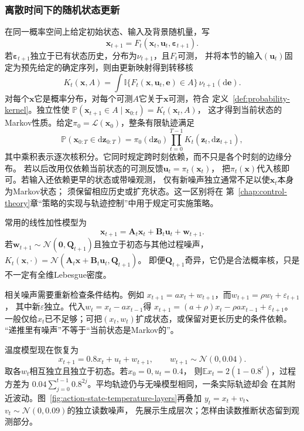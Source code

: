 \subsubsection{离散时间下的随机状态更新}
在同一概率空间上给定初始状态、输入及背景随机量，写
\[
  \bm x_{t+1}=F_t(\bm x_t,\bm u_t,\bm\varepsilon_{t+1}).
\]
若$\bm\varepsilon_{t+1}$独立于已有状态历史，分布为$\nu_{t+1}$，且$F_t$可测，
并将本节的输入$(\bm u_t)$固定为预先给定的确定序列，则由更新映射得到转移核
\[
  K_t(\bm x,A)=\int
    \mathbb I\{F_t(\bm x,\bm u_t,\bm e)\in A\}\,\nu_{t+1}(\mathrm d\bm e).
\]
对每个$\bm x$它是概率分布，对每个可测$A$它关于$\bm x$可测，符合
定义~\ref{def:probability-kernel}。独立性使
$\mathbb P(\bm x_{t+1}\in A\mid\bm x_{0:t})=K_t(\bm x_t,A)$，
这才得到当前状态的Markov性质。给定$\pi_0=\mathcal L(\bm x_0)$，整条有限轨迹满足
\[
  \mathbb P(\bm x_{0:T}\in\mathrm d\bm z_{0:T})
  =\pi_0(\mathrm d\bm z_0)
    \prod_{t=0}^{T-1}K_t(\bm z_t,\mathrm d\bm z_{t+1}),
\]
其中乘积表示逐次核积分。它同时规定跨时刻依赖，而不只是各个时刻的边缘分布。
若以后改用仅依赖当前状态的可测反馈$\bm u_t=\pi_t(\bm x_t)$，
把$\pi_t(\bm x)$代入核即可。若输入还依赖更早的状态或带噪观测，
仅有新噪声独立通常不足以使$\bm x_t$本身为Markov状态；
须保留相应历史或扩充状态。这一区别将在
第~\ref{chap:control-theory}章“策略的实现与轨迹控制”中用于规定可实施策略。

常用的线性加性模型为
\begin{equation}
  \bm x_{t+1}=\bm A_t\bm x_t+\bm B_t\bm u_t+\bm w_{t+1}.
  \label{eq:dynamical-linear-state-model}
\end{equation}
若$\bm w_{t+1}\sim\mathcal N(\bm0,\bm Q_{t+1})$且独立于初态与其他过程噪声，
$K_t(\bm x,\cdot)=\mathcal N(\bm A_t\bm x+\bm B_t\bm u_t,\bm Q_{t+1})$。
即便$\bm Q_{t+1}$奇异，它仍是合法概率核，只是不一定有全维Lebesgue密度。

相关噪声需要重新检查条件结构。例如
$x_{t+1}=a x_t+w_{t+1}$，而$w_{t+1}=\rho w_t+\varepsilon_{t+1}$，
其中新$\varepsilon$独立。代入$w_t=x_t-a x_{t-1}$得
$x_{t+1}=(a+\rho)x_t-\rho a x_{t-1}+\varepsilon_{t+1}$。
一般仅给$x_t$已不足够；可把$(x_t,w_t)$扩成状态，或保留对更长历史的条件依赖。
“递推里有噪声”不等于“当前状态是Markov的”。

温度模型现在恢复为
\[
  x_{t+1}=0.8x_t+u_t+w_{t+1},\qquad
  w_{t+1}\sim\mathcal N(0,0.04).
\]
取各$w_t$相互独立且独立于初态。若$x_0=0,u_t=0.4$，
则$\mathbb E x_t=2(1-0.8^t)$，过程方差为
$0.04\sum_{j=0}^{t-1}0.8^{2j}$。平均轨迹仍与无噪模型相同，一条实际轨迹却会
在其附近波动。图~\ref{fig:action-state-temperature-layers}再叠加
$y_t=x_t+v_t$、$v_t\sim\mathcal N(0,0.09)$的独立读数噪声，
先展示生成层次；怎样由读数推断状态留到观测部分。

